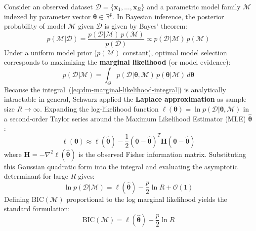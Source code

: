 Consider an observed dataset $\mathcal{D} = \{\mathbf{x}_1, \dots, \mathbf{x}_R\}$ and a parametric model family $\mathcal{M}$ indexed by parameter vector $\boldsymbol{\theta} \in \mathbb{R}^p$. In Bayesian inference, the posterior probability of model $\mathcal{M}$ given $\mathcal{D}$ is given by Bayes' theorem:
\begin{equation}
\label{eq:dm-bayes-model-posterior}
p(\mathcal{M} | \mathcal{D}) = \frac{p(\mathcal{D} | \mathcal{M}) \, p(\mathcal{M})}{p(\mathcal{D})} \propto p(\mathcal{D} | \mathcal{M}) \, p(\mathcal{M})
\end{equation}
Under a uniform model prior ($p(\mathcal{M})$ constant), optimal model selection corresponds to maximizing the \textbf{marginal likelihood} (or model evidence):
\begin{equation}
\label{eq:dm-marginal-likelihood-integral}
p(\mathcal{D} | \mathcal{M}) = \int_{\Theta} p(\mathcal{D} | \boldsymbol{\theta}, \mathcal{M}) \, p(\boldsymbol{\theta} | \mathcal{M}) \, d\boldsymbol{\theta}
\end{equation}
Because the integral~(\ref{eq:dm-marginal-likelihood-integral}) is analytically intractable in general, Schwarz applied the \textbf{Laplace approximation} as sample size $R \to \infty$. Expanding the log-likelihood function $\ell(\boldsymbol{\theta}) = \ln p(\mathcal{D} | \boldsymbol{\theta}, \mathcal{M})$ in a second-order Taylor series around the Maximum Likelihood Estimator (MLE) $\hat{\boldsymbol{\theta}}$:
\begin{equation}
\label{eq:dm-taylor-laplace}
\ell(\boldsymbol{\theta}) \approx \ell(\hat{\boldsymbol{\theta}}) - \frac{1}{2} (\boldsymbol{\theta} - \hat{\boldsymbol{\theta}})^T \mathbf{H} (\boldsymbol{\theta} - \hat{\boldsymbol{\theta}})
\end{equation}
where $\mathbf{H} = -\nabla^2 \ell(\hat{\boldsymbol{\theta}})$ is the observed Fisher information matrix. Substituting this Gaussian quadratic form into the integral and evaluating the asymptotic determinant for large $R$ gives:
\begin{equation}
\label{eq:dm-bic-derivation-limit}
\ln p(\mathcal{D} | \mathcal{M}) = \ell(\hat{\boldsymbol{\theta}}) - \frac{p}{2} \ln R + \mathcal{O}(1)
\end{equation}
Defining $\mathrm{BIC}(\mathcal{M})$ proportional to the log marginal likelihood yields the standard formulation:
\begin{equation}
\label{eq:dm-bic-definition}
\mathrm{BIC}(\mathcal{M}) = \ell(\hat{\boldsymbol{\theta}}) - \frac{p}{2} \ln R
\end{equation}
